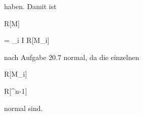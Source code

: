 {{}
{}{}{}
haben. Damit ist


\mavergleichskette

{\vergleichskette

{ R[M]
}

{ = }{ \bigcap_{i \in I} R[M_i]
}

{  }{
}

{    }{
}

{   }{
}

}
{}{}{}
nach Aufgabe 20.7
normal, da die einzelnen


\mavergleichskette

{\vergleichskette

{ R[M_i]
}

{ \cong }{ R[\N \times \Z^{n-1}]
}

{  }{
}

{    }{
}

{   }{
}

}
{}{}{}
normal sind.


}



